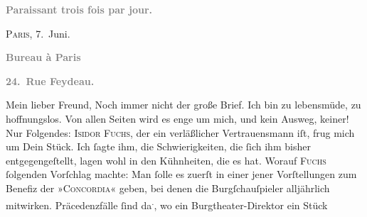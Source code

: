 \begin{ledgroupsized}[t]{13cm}
           \pstart
           \begin{otherlanguage}{french}\textcolor{gray}{\textbf{\textbf{Paraissant trois fois par jour.}}}\end{otherlanguage}\hfill \textsc{Paris}, 7. Juni.\pend
           \pstart
           \begin{otherlanguage}{french}\textcolor{gray}{\textbf{\textbf{Bureau à Paris}}}\end{otherlanguage}\pend
           \pstart
           \begin{otherlanguage}{french}\textcolor{gray}{\textbf{\textbf{24. Rue Feydeau.}}}\end{otherlanguage}\pend
           \pstart\center{}Mein lieber Freund,\pend\pstart
           Noch immer nicht der große Brief. Ich bin zu lebensmüde, zu hoffnungslos. Von allen
               Seiten wird es enge um mich, und kein Ausweg, keiner!\pend
           \pstart
           Nur Folgendes: \textsc{Isidor Fuchs}, der ein verläßlicher Vertrauensmann iſt, frug mich um Dein Stück. Ich ſagte ihm, die Schwierig{\pb}keiten, die ſich ihm bisher entgegengeſtellt, lagen
               wohl in den Kühnheiten, die es hat. Worauf \textsc{Fuchs} ſolgenden Vorſchlag machte: Man ſolle es zuerſt in einer jener Vorſtellungen
               zum Benefiz der »\textsc{Concordia}« geben, bei denen die Burgſchauſpieler alljährlich mitwirken. Präcedenzfälle ſind da\substVorne{}\textsuperscript{.}\substDazwischen{},\substHinten{} wo ein Burgtheater-Direktor ein Stück

\end{ledgroupsized}
